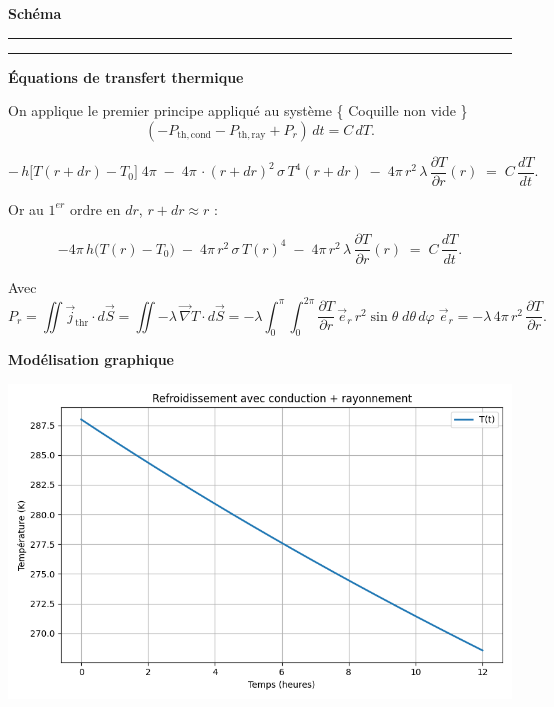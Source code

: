\documentclass[a4paper,12pt]{article}
\begin{document}
\vspace{0.5cm}
\textbf{Schéma}
\\
\noindent\textcolor{gray}{\rule{\linewidth}{0.4pt}}

    
\begin{center}
  
\end{center}
\noindent\textcolor{gray}{\rule{\linewidth}{0.4pt}}

\textbf{Équations de transfert thermique}

On applique le premier principe appliqué au système \{ Coquille non vide  \}
\[
(-P_{\mathrm{th,cond}} - P_{\mathrm{th,ray}} + P_r)\,dt = C\,dT.
\]

\[
-\,h\bigl[T(r+dr)-T_0\bigr]\;4\pi
\;-\;4\pi\,\cdot (r+dr)^2\,\sigma\,T^4(r+dr)
\;-\;4\pi\,r^2\,\lambda\,\frac{\partial T}{\partial r}(r)
\;=\;C\,\frac{dT}{dt}.
\]

\medskip

Or au \(1^{er}\) ordre en \(dr\), \(r+dr\approx r\) :

\[
-4\pi\,h\bigl(T(r)-T_0\bigr)
\;-\;4\pi\,r^2\,\sigma\,T(r)^4
\;-\;4\pi\,r^2\,\lambda\,\frac{\partial T}{\partial r}(r)
\;=\;C\,\frac{dT}{dt}.
\]

\medskip

Avec
\[
P_{r}
= \iint\vec j_{\mathrm{thr}}\cdot d\vec S
= \iint -\lambda\,\vec{ \nabla } T\cdot d\vec S
= -\lambda
  \int_{0}^{\pi}\!\!\int_{0}^{2\pi}
    \frac{\partial T}{\partial r}\,\vec e_{r}\,
    r^2\sin\theta\;d\theta\,d\varphi\;\vec e_{r}
= -\lambda\,4\pi\,r^2\,\frac{\partial T}{\partial r}.
\]

\vspace{1cm}
\textbf{Modélisation graphique}
    
    \includegraphics[width=0.8\linewidth]{../modele3/figures/modele3_coquille-conduction-rayonnement.png}    
\end{document}
